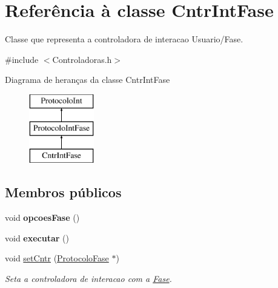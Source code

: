 \hypertarget{class_cntr_int_fase}{
\section{\-Referência à classe \-Cntr\-Int\-Fase}
\label{class_cntr_int_fase}
}


\-Classe que representa a controladora de interacao \-Usuario/\-Fase.  




{\ttfamily \#include $<$\-Controladoras.\-h$>$}

\-Diagrama de heranças da classe \-Cntr\-Int\-Fase\begin{figure}[H]
\begin{center}
\leavevmode
\includegraphics[height=3.000000cm]{class_cntr_int_fase}
\end{center}
\end{figure}
\subsection*{\-Membros públicos}
\begin{DoxyCompactItemize}
\item 
\hypertarget{class_cntr_int_fase_a0a48be247353d3e83c0406ed5d552aa5}{
void {\bfseries opcoes\-Fase} ()}
\label{class_cntr_int_fase_a0a48be247353d3e83c0406ed5d552aa5}

\item 
\hypertarget{class_cntr_int_fase_afe21d430453186c7a9d00cd7524a25db}{
void {\bfseries executar} ()}
\label{class_cntr_int_fase_afe21d430453186c7a9d00cd7524a25db}

\item 
void \hyperlink{class_cntr_int_fase_a51a1c838a7747917ec130c9e69b9d64b}{set\-Cntr} (\hyperlink{class_protocolo_fase}{\-Protocolo\-Fase} $\ast$)
\begin{DoxyCompactList}\small\item\em \-Seta a controladora de interacao com a \hyperlink{class_fase}{\-Fase}. \end{DoxyCompactList}\end{DoxyCompactItemize}
